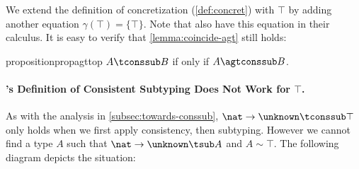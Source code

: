 We extend the definition of concretization (\cref{def:concret}) with $\top$
by adding another equation $\gamma(\top) = \{\top\}$. Note that
\citet{castagna2017gradual} also have this equation in their calculus.
It is easy to verify that \cref{lemma:coincide-agt} still holds:
\begin{restatable}{proposition}{propagttop}
  \label{prop:agt-top}
  $A \tconssub B$ if only if $A \agtconssub B$.
\end{restatable}


\paragraph{\citeauthor{siek2007gradual}'s Definition of Consistent Subtyping Does Not Work for $\top$.}

As with the analysis in \cref{subsec:towards-conssub}, $\nat \to \unknown
\tconssub \top$ only holds when we first apply consistency, then subtyping.
However we cannot find a type $A$ such that
$\nat \to \unknown \tsub A$ and $A \sim \top$. The
following diagram depicts the situation:
\begin{center}
\end{center}

